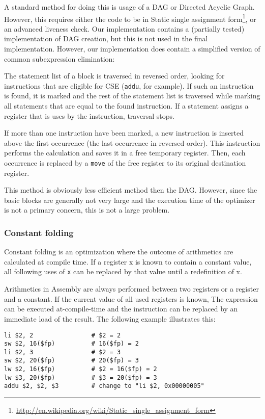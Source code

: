 \documentclass[10pt,a4paper]{article}
\begin{document}
A standard method for doing this is usage of a DAG or Directed Acyclic Graph.
However, this requires either the code to be in Static single
assignment
form\footnote{\url{http://en.wikipedia.org/wiki/Static\_single\_assignment\_form}},
or an advanced liveness check. Our implementation contains a (partially tested)
implementation of DAG creation, but this is not used in the final
implementation.  However, our implementation does contain a simplified version
of common subexpression elimination:

The statement list of a block is traversed in reversed order, looking for
instructions that are eligible for CSE (\texttt{addu}, for example). If such an
instruction is found, it is marked and the rest of the statement list is
traversed while marking all statements that are equal to the found instruction.
If a statement assigns a register that is uses by the instruction, traversal
stops.

If more than one instruction have been marked, a new instruction is inserted
above the first occurrence (the last occurrence in reversed order). This
instruction performs the calculation and saves it in a free temporary register.
Then, each occurrence is replaced by a \texttt{move} of the free register to
its original destination register.

This method is obviously less efficient method then the DAG.  However, since
the basic blocks are generally not very large and the execution time of the
optimizer is not a primary concern, this is not a large problem.

\subsubsection{Constant folding}

Constant folding is an optimization where the outcome of arithmetics are
calculated at compile time. If a register x is known to contain a constant
value, all following uses of \texttt{x} can be replaced by that value until a
redefinition of x.

Arithmetics in Assembly are always performed between two registers or a
register and a constant. If the current value of all used registers is known,
The expression can be executed at-compile-time and the instruction can be
replaced by an immediate load of the result. The following example illustrates
this:
\begin{verbatim}
li $2, 2                # $2 = 2
sw $2, 16($fp)          # 16($fp) = 2
li $2, 3                # $2 = 3
sw $2, 20($fp)          # 20($fp) = 3
lw $2, 16($fp)          # $2 = 16($fp) = 2
lw $3, 20($fp)          # $3 = 20($fp) = 3
addu $2, $2, $3         # change to "li $2, 0x00000005"
\end{verbatim}
\end{document}
